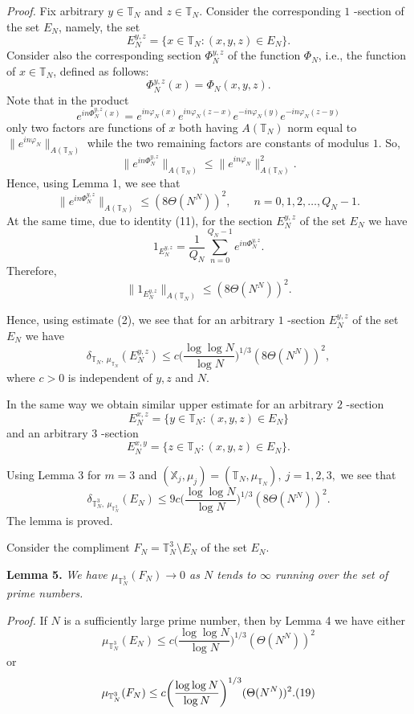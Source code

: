 \documentclass[12pt]{article}
\begin{document}
\emph{Proof.} Fix arbitrary $y\in\mathbb T_N$ and $z\in\mathbb
T_N$. Consider the corresponding $1$ -section of the set $E_N$,
namely, the set
$$
E_N^{y, z}=\{x\in\mathbb T_N : (x, y, z)\in E_N\}.
$$
Consider also the corresponding section $\Phi_N^{y, z}$ of the
function $\Phi_N$, i.e., the function of $x\in\mathbb T_N$,
defined as follows:
$$
\Phi_N^{y, z}(x)=\Phi_N(x, y, z).
$$
Note that in the product
$$
e^{in\Phi_N^{y, z}(x)}=
e^{in\varphi_N(x)}e^{in\varphi_N(z-x)}
e^{-in\varphi_N(y)}e^{-in\varphi_N(z-y)}
$$
only two factors are functions of $x$ both having $A(\mathbb
T_N)$ norm equal to $\|e^{in\varphi_N}\|_{A(\mathbb T_N)}$
while the two remaining factors are constants of modulus $1$.
So,
$$
\|e^{in\Phi_N^{y, z}}\|_{A(\mathbb T_N)}\leq
\|e^{in\varphi_N}\|_{A(\mathbb T_N)}^2.
$$
Hence, using Lemma 1, we see that
$$
\|e^{in\Phi_N^{y, z}}\|_{A(\mathbb T_N)}\leq (8\Theta(N^N))^2,
\qquad n=0, 1, 2, \ldots, Q_N-1.
$$
At the same time, due to identity (11), for the section $E_N^{y,
z}$ of the set $E_N$ we have
$$
1_{E_N^{y, z}}=\frac{1}{Q_N}\sum_{n=0}^{Q_N-1}e^{in\Phi_N^{y, z}}.
$$
Therefore,
$$
\|1_{E_N^{y, z}}\|_{A(\mathbb T_N)}\leq(8\Theta(N^N))^2.
$$

  Hence, using estimate (2), we see that for an
arbitrary $1$ -section $E_N^{y, z}$ of the set $E_N$ we have
$$
\delta_{\mathbb T_N, ~\mu_{\mathbb T_N}}(E_N^{y, z})
\leq c\bigg(\frac{\log\log N}{\log N}\bigg)^{1/3}(8\Theta(N^N))^2,
$$
where $c>0$ is independent of $y, z$ and $N$.

  In the same way we obtain similar upper estimate for an
arbitrary $2$ -section
$$
E_N^{x, z}=\{y\in\mathbb T_N : (x, y, z)\in E_N\}
$$
and an arbitrary $3$ -section
$$
E_N^{x, y}=\{z\in\mathbb T_N : (x, y, z)\in E_N\}.
$$

  Using Lemma 3 for $m=3$ and
$(\mathbb X_j, \mu_j)=(\mathbb T_N, \mu_{\mathbb T_N}), ~j=1, 2,
3,$ we see that
$$
\delta_{\mathbb T_N^3, ~\mu_{\mathbb T_N^3}}(E_N)
\leq 9 c\bigg(\frac{\log\log N}{\log N}\bigg)^{1/3}(8\Theta(N^N))^2.
$$
The lemma is proved.

\quad

  Consider the compliment $F_N=\mathbb T_N^3\setminus E_N$
of the set $E_N$.

\quad

\textbf{Lemma 5.} \emph{We have $\mu_{\mathbb
T_N^3}(F_N)\rightarrow 0$ as $N$ tends to $\infty$ running over
the set of prime numbers.}

\quad

\emph{Proof.} If $N$ is a sufficiently large prime number, then by
Lemma 4 we have either
$$
\mu_{\mathbb T_N^3}(E_N)\leq
c\bigg(\frac{\log\log N}{\log N}\bigg)^{1/3}(\Theta(N^N))^2
$$
or
$$
\mu_{\mathbb T_N^3}(F_N)\leq
c\bigg(\frac{\log\log N}{\log N}\bigg)^{1/3}(\Theta(N^N))^2.
\relax(19)
$$
\end{document}
